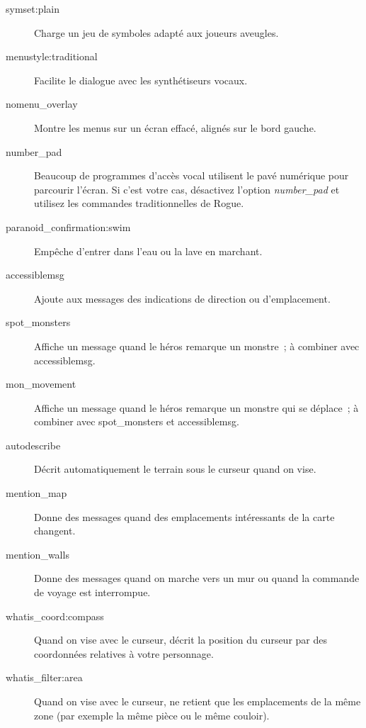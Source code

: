 \documentclass[titlepage]{article}
\begin{document}
\begin{description}
\item[{symset:plain}]
Charge un jeu de symboles adapté aux joueurs aveugles.

\item[{menustyle:traditional}]
Facilite le dialogue avec les synthétiseurs vocaux.

\item[{nomenu\_overlay}]
Montre les menus sur un écran effacé, alignés sur le bord gauche.

\item[{number\_pad}]
Beaucoup de programmes d'accès vocal utilisent le pavé numérique pour
parcourir l'écran.
Si c'est votre cas, désactivez l'option
\textit{number\_pad}
et utilisez les commandes traditionnelles de Rogue.

\item[{paranoid\_confirmation:swim}]
Empêche d'entrer dans l'eau ou la lave en marchant.

\item[{accessiblemsg}]
Ajoute aux messages des indications de direction ou d'emplacement.

\item[{spot\_monsters}]
Affiche un message quand le héros remarque un monstre~; à combiner avec
accessiblemsg.

\item[{mon\_movement}]
Affiche un message quand le héros remarque un monstre qui se déplace~; à
combiner avec spot\_monsters et accessiblemsg.

\item[{autodescribe}]
Décrit automatiquement le terrain sous le curseur quand on vise.

\item[{mention\_map}]
Donne des messages quand des emplacements intéressants de la carte
changent.

\item[{mention\_walls}]
Donne des messages quand on marche vers un mur ou quand la commande de
voyage est interrompue.

\item[{whatis\_coord:compass}]
Quand on vise avec le curseur, décrit la position du curseur par des
coordonnées relatives à votre personnage.

\item[{whatis\_filter:area}]
Quand on vise avec le curseur, ne retient que les emplacements de la même
zone (par exemple la même pièce ou le même couloir).


\end{description}
\end{document}
